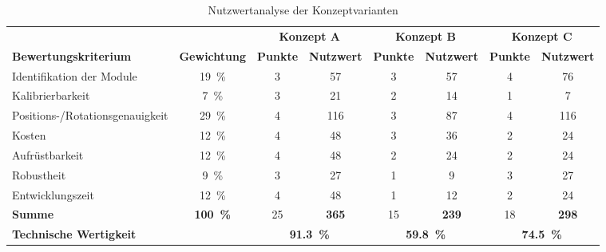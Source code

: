 \begin{table}[htbp]
    \centering
    \caption{Nutzwertanalyse der Konzeptvarianten}
    \label{tab:nutzwertanalyse}
    \small
    \renewcommand{\arraystretch}{1.3}
    \begin{tabular}{>{\raggedright\arraybackslash}p{3.6cm} c cc cc cc}
        \toprule
        & & \multicolumn{2}{c}{\textbf{Konzept A}}
          & \multicolumn{2}{c}{\textbf{Konzept B}}
          & \multicolumn{2}{c}{\textbf{Konzept C}} \\
        \cmidrule(lr){3-4} \cmidrule(lr){5-6} \cmidrule(lr){7-8}
        \textbf{Bewertungskriterium} & \textbf{Gewichtung}
        & \textbf{Punkte} & \textbf{Nutzwert}
        & \textbf{Punkte} & \textbf{Nutzwert}
        & \textbf{Punkte} & \textbf{Nutzwert} \\
        \midrule
        Identifikation der Module         & \SI{19}{\percent} & 3 & 57  & 3 & 57  & 4 & 76  \\
        Kalibrierbarkeit                  &  \SI{7}{\percent} & 3 & 21  & 2 & 14  & 1 & 7   \\
        Positions-/\newline Rotationsgenauigkeit
                                          & \SI{29}{\percent} & 4 & 116 & 3 & 87  & 4 & 116 \\
        Kosten                            & \SI{12}{\percent} & 4 & 48  & 3 & 36  & 2 & 24  \\
        Aufrüstbarkeit                    & \SI{12}{\percent} & 4 & 48  & 2 & 24  & 2 & 24  \\
        Robustheit                        &  \SI{9}{\percent} & 3 & 27  & 1 & 9   & 3 & 27  \\
        Entwicklungszeit                  & \SI{12}{\percent} & 4 & 48  & 1 & 12  & 2 & 24  \\
        \midrule
        \textbf{Summe}                    & \textbf{\SI{100}{\percent}}
                                          & 25 & \textbf{365}
                                          & 15 & \textbf{239}
                                          & 18 & \textbf{298} \\
        \textbf{Technische Wertigkeit}    &
                                          & \multicolumn{2}{c}{\textbf{\SI{91,3}{\percent}}}
                                          & \multicolumn{2}{c}{\textbf{\SI{59,8}{\percent}}}
                                          & \multicolumn{2}{c}{\textbf{\SI{74,5}{\percent}}} \\
        \bottomrule
    \end{tabular}
\end{table}


